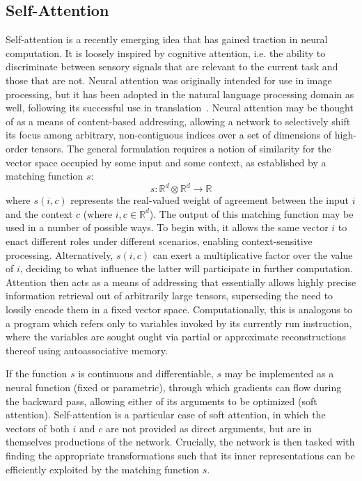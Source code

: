 \subsection{Self-Attention}
Self-attention is a recently emerging idea that has gained traction in neural computation.
It is loosely inspired by cognitive attention, i.e. the ability to discriminate between sensory signals that are relevant to the current task and those that are not.
Neural attention was originally intended for use in image processing, but it has been adopted in the natural language processing domain as well, following its successful use in translation~\cite{bahdanau2014neural}.
Neural attention may be thought of as a means of content-based addressing, allowing a network to selectively shift its focus among arbitrary, non-contiguous indices over a set of dimensions of high-order tensors.
The general formulation requires a notion of similarity for the vector space occupied by some input and some context, as established by a matching function $s$:
\[
s: \mathbb{R}^d \otimes \mathbb{R}^d \to \mathbb{R}
\]
where $s(i, c)$  represents the real-valued weight of agreement between the input $i$ and the context $c$ (where $i, c \in \mathbb{R}^d$).
The output of this matching function may be used in a number of possible ways. 
To begin with, it allows the same vector $i$ to enact different roles under different scenarios, enabling context-sensitive processing.
Alternatively, $s(i,c)$ can exert a multiplicative factor over the value of $i$, deciding to what influence the latter will participate in further computation.
Attention then acts as a means of addressing that essentially allows highly precise information retrieval out of arbitrarily large tensors, superseding the need to lossily encode them in a fixed vector space.
Computationally, this is analogous to a program which refers only to variables invoked by its currently run instruction, where the variables are sought ought via partial or approximate reconstructions thereof using autoassociative memory.


If the function $s$ is continuous and differentiable, $s$ may be implemented as a neural function (fixed or parametric), through which gradients can flow during the backward pass, allowing either of its arguments to be optimized (soft attention).
Self-attention is a particular case of soft attention, in which the vectors of both $i$ and $c$ are not provided as direct arguments, but are in themselves productions of the network.
Crucially, the network is then tasked with finding the appropriate transformations such that its inner representations can be efficiently exploited by the matching function $s$.

